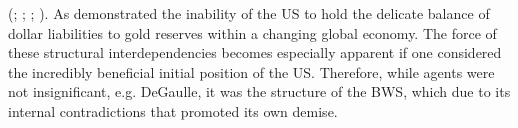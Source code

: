 \documentclass[11pt]{article}
\begin{document}
(\cite{KlimiukZbigniew2016TPaO, bordo2014tales, }; \cite[p.~229-230]{BeaudMichel1983Ahoc};  \cite[p.~73]{1993Arot}; \cite[p.~197]{JonesDanielStedman2014Motu}). 
As demonstrated the inability of the US to hold the delicate balance of dollar liabilities to gold reserves within a changing global economy. The force of these structural interdependencies becomes especially apparent if one considered the incredibly beneficial initial position of the US. Therefore, while agents were not insignificant, e.g. DeGaulle, it was the structure of the BWS, which due to its internal contradictions that promoted its own demise. \\
\end{document}
